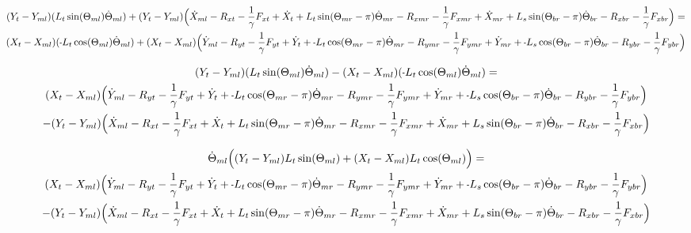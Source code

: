 \documentclass[11pt, landscape]{article}
\newcommand{\mn}{\scalebox{0.7}[1.0]{-}}
\begin{document}
\begin{multline}
(Y_{t } - Y_{ml})(L_{t}\sin(\Theta_{ml}) \dot{\Theta}_{ml}) + (Y_{t } - Y_{ml})\Big( \dot{X}_{ml} - R_{xt } - \frac{1}{\gamma}F_{xt } + \dot{X}_{t } + L_{t}\sin(\Theta_{mr}-\pi)  \dot{\Theta}_{mr}
- R_{xmr} - \frac{1}{\gamma}F_{xmr} + \dot{X}_{mr} + L_{s}\sin(\Theta_{br}-\pi)  \dot{\Theta}_{br} - R_{xbr} - \frac{1}{\gamma}F_{xbr} \Big) = \\
(X_{t } - X_{ml})(\mn L_{t}\cos(\Theta_{ml}) \dot{\Theta}_{ml}) + (X_{t } - X_{ml}) \Big( \dot{Y}_{ml} - R_{yt} - \frac{1}{\gamma}F_{yt } + \dot{Y}_{t } + \mn L_{t}\cos(\Theta_{mr}-\pi)  \dot{\Theta}_{mr}
- R_{ymr} - \frac{1}{\gamma}F_{ymr} + \dot{Y}_{mr} + \mn L_{s}\cos(\Theta_{br}-\pi)  \dot{\Theta}_{br} - R_{ybr} - \frac{1}{\gamma}F_{ybr}\Big)
\end{multline}

\begin{multline}
(Y_{t } - Y_{ml})(L_{t}\sin(\Theta_{ml}) \dot{\Theta}_{ml}) - (X_{t } - X_{ml})(\mn L_{t}\cos(\Theta_{ml}) \dot{\Theta}_{ml}) = \\
(X_{t } - X_{ml}) \Big( \dot{Y}_{ml} - R_{yt} - \frac{1}{\gamma}F_{yt } + \dot{Y}_{t } + \mn L_{t}\cos(\Theta_{mr}-\pi)  \dot{\Theta}_{mr}
- R_{ymr} - \frac{1}{\gamma}F_{ymr} + \dot{Y}_{mr} + \mn L_{s}\cos(\Theta_{br}-\pi)  \dot{\Theta}_{br} - R_{ybr} - \frac{1}{\gamma}F_{ybr}\Big) \\
- (Y_{t } - Y_{ml})\Big( \dot{X}_{ml} - R_{xt } - \frac{1}{\gamma}F_{xt } + \dot{X}_{t } + L_{t}\sin(\Theta_{mr}-\pi)  \dot{\Theta}_{mr}
- R_{xmr} - \frac{1}{\gamma}F_{xmr} + \dot{X}_{mr} + L_{s}\sin(\Theta_{br}-\pi)  \dot{\Theta}_{br} - R_{xbr} - \frac{1}{\gamma}F_{xbr} \Big)
\end{multline}

\begin{multline}
\dot{\Theta}_{ml} \Big((Y_{t } - Y_{ml})L_{t}\sin(\Theta_{ml}) + (X_{t } - X_{ml})L_{t}\cos(\Theta_{ml}) \Big) = \\
(X_{t } - X_{ml}) \Big( \dot{Y}_{ml} - R_{yt} - \frac{1}{\gamma}F_{yt } + \dot{Y}_{t } + \mn L_{t}\cos(\Theta_{mr}-\pi)  \dot{\Theta}_{mr}
- R_{ymr} - \frac{1}{\gamma}F_{ymr} + \dot{Y}_{mr} + \mn L_{s}\cos(\Theta_{br}-\pi)  \dot{\Theta}_{br} - R_{ybr} - \frac{1}{\gamma}F_{ybr}\Big) \\
- (Y_{t } - Y_{ml})\Big( \dot{X}_{ml} - R_{xt } - \frac{1}{\gamma}F_{xt } + \dot{X}_{t } + L_{t}\sin(\Theta_{mr}-\pi)  \dot{\Theta}_{mr}
- R_{xmr} - \frac{1}{\gamma}F_{xmr} + \dot{X}_{mr} + L_{s}\sin(\Theta_{br}-\pi)  \dot{\Theta}_{br} - R_{xbr} - \frac{1}{\gamma}F_{xbr} \Big)
\end{multline}
\end{document}

